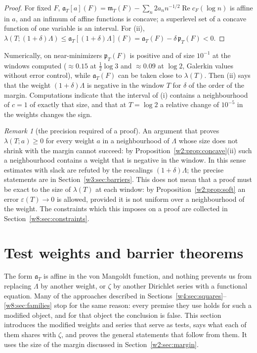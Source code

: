 \documentclass[11pt]{amsart}
\theoremstyle{definition}
\theoremstyle{remark}
\newtheorem{remark}[theorem]{Remark}
\numberwithin{equation}{section}
\DeclareMathOperator{\Rel}{Re}
\newcommand{\cF}{c_F}                                  %
\newcommand{\mT}{\mathfrak{m}_T}                       %
\newcommand{\pT}{\mathfrak{p}_T}                       %
\newcommand{\aT}{\mathfrak{a}_T}                       %
\newcommand{\lam}{\lambda(T)}                          %
\begin{document}
\begin{proof}
For fixed $F$, $\aT[a](F)=\mT(F)-\sum_n2a_nn^{-1/2}\Rel\cF(\log n)$ is affine in $a$, and an infimum of affine functions
is concave; a superlevel set of a concave function of one variable is an interval. For (ii),
$\lambda(T;(1+\delta)\Lambda)\le\aT[(1+\delta)\Lambda](F)=\aT(F)-\delta\,\pT(F)<0$.
\end{proof}

Numerically, on near-minimizers $\pT(F)$ is positive and of size $10^{-1}$ at the windows computed ($\approx0.15$
at $\frac12\log3$ and $\approx0.09$ at $\log2$, Galerkin values without error control), while $\aT(F)$ can be taken
close to $\lam$. Then (ii) says that the weight $(1+\delta)\Lambda$ is negative in the window $T$ for $\delta$ of the
order of the margin. Computations indicate that the interval of (i) contains a neighbourhood of $c=1$ of exactly that
size, and that at $T=\log2$ a relative change of $10^{-5}$ in the weights changes the sign.

\begin{remark}[the precision required of a proof]\label{w2:obs:precision}
An argument that proves $\lambda(T;a)\ge0$ for every weight $a$ in a neighbourhood of $\Lambda$ whose size does not
shrink with the margin cannot succeed: by Proposition~\ref{w2:prop:concave}(ii) such a neighbourhood contains a weight
that is negative in the window. In this sense estimates with slack are refuted by the rescalings $(1+\delta)\Lambda$;
the precise statements are in Section~\ref{w3:sec:barriers}. This does not mean that a proof must be exact to the size
of $\lam$ at each window: by Proposition~\ref{w2:prop:soft} an error $\varepsilon(T)\to0$ is allowed, provided it is not
uniform over a neighbourhood of the weight. The constraints which this imposes on a proof are collected in
Section~\ref{w8:sec:constraints}.
\end{remark}

\section{Test weights and barrier theorems}\label{w3:sec:falsifiers}

The form $\aT$ is affine in the von Mangoldt function, and nothing prevents us from replacing $\Lambda$ by another
weight, or $\zeta$ by another Dirichlet series with a functional equation. Many of the approaches described in
Sections~\ref{w4:sec:squares}--\ref{w8:sec:families} stop for the same reason: every premise they use holds for such
a modified object, and for that object the conclusion is false. This section introduces the modified weights and
series that serve as tests, says what each of them shares with $\zeta$, and proves the general statements that follow
from them. It uses the size of the margin discussed in Section~\ref{w2:sec:margin}.
\end{document}
